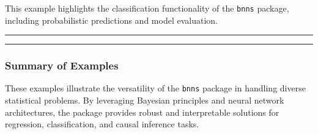 \documentclass[
]{jss}
\begin{document}
This example highlights the classification functionality of the
\texttt{bnns} package, including probabilistic predictions and model
evaluation.

\begin{center}\rule{0.5\linewidth}{0.5pt}\end{center}

\begin{center}\rule{0.5\linewidth}{0.5pt}\end{center}

\subsubsection{Summary of Examples}\label{summary-of-examples}

These examples illustrate the versatility of the \texttt{bnns} package
in handling diverse statistical problems. By leveraging Bayesian
principles and neural network architectures, the package provides robust
and interpretable solutions for regression, classification, and causal
inference tasks.
\end{document}
